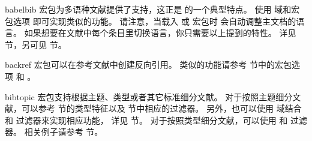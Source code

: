 \begin{marglist}

\item[babelbib]
 宏包为多语种文献提供了支持，这正是 \biblatex 的一个典型特点。
使用  域和宏包选项  即可实现类似的功能。
请注意，当载入  或  宏包时 \biblatex 会自动调整主文档的语言。
如果想要在文献中每个条目里切换语言，你只需要以上提到的特性。
详见  节，另可见  节。

\item[backref]
 宏包可以在参考文献中创建反向引用。
类似的功能请参考  节中的宏包选项  和 。

\item[bibtopic]
 宏包支持根据主题、类型或者其它标准细分文献。
对于按照主题细分文献，可以参考  节的类型特征以及  节中相应的过滤器。
另外，也可以使用  域结合  和  过滤器来实现相应功能，
详见  节。
对于按照类型细分文献，可以使用  和  过滤器。
相关例子请参考  节。


\end{marglist}
